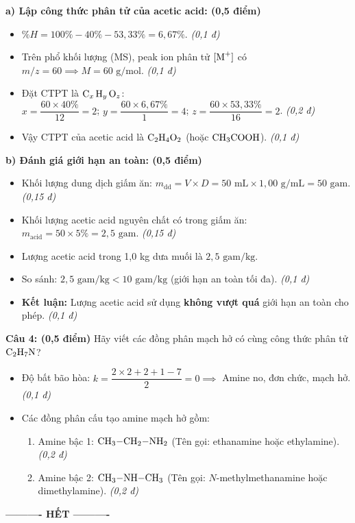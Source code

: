 \documentclass[11pt,a4paper]{article}
\begin{document}
\begin{tcolorbox}[colback=white,colframe=solBlue,title=\textbf{Lời giải chi tiết và Biểu điểm Câu 3:}]
\textbf{a) Lập công thức phân tử của acetic acid: (0,5 điểm)}
\begin{itemize}[leftmargin=1.2cm]
\item $\%H = 100\% - 40\% - 53,33\% = 6,67\%$. \hfill \textit{(0,1 đ)}
\item Trên phổ khối lượng (MS), peak ion phân tử $[\ce{M+}]$ có $m/z = 60 \implies M = 60\text{ g/mol}$. \hfill \textit{(0,1 đ)}
\item Đặt CTPT là $\ce{C_x H_y O_z}$:\\
  $x = \dfrac{60 \times 40\%}{12} = 2$; \quad $y = \dfrac{60 \times 6,67\%}{1} = 4$; \quad $z = \dfrac{60 \times 53,33\%}{16} = 2$. \hfill \textit{(0,2 đ)}
\item Vậy CTPT của acetic acid là $\ce{C2H4O2}$ (hoặc $\ce{CH3COOH}$). \hfill \textit{(0,1 đ)}
\end{itemize}
\textbf{b) Đánh giá giới hạn an toàn: (0,5 điểm)}
\begin{itemize}[leftmargin=1.2cm]
\item Khối lượng dung dịch giấm ăn: $m_{\text{dd}} = V \times D = 50\text{ mL} \times 1,00\text{ g/mL} = 50\text{ gam}$. \hfill \textit{(0,15 đ)}
\item Khối lượng acetic acid nguyên chất có trong giấm ăn:
  $m_{\text{acid}} = 50 \times 5\% = 2,5\text{ gam}$. \hfill \textit{(0,15 đ)}
\item Lượng acetic acid trong 1,0 kg dưa muối là $2,5\text{ gam/kg}$.
\item So sánh: $2,5\text{ gam/kg} < 10\text{ gam/kg}$ (giới hạn an toàn tối đa). \hfill \textit{(0,1 đ)}
\item \textbf{Kết luận:} Lượng acetic acid sử dụng \textbf{không vượt quá} giới hạn an toàn cho phép. \hfill \textit{(0,1 đ)}
\end{itemize}
\end{tcolorbox}

\vspace{4pt}
\noindent
\textbf{Câu 4: (0,5 điểm)} Hãy viết các đồng phân mạch hở có cùng công thức phân tử $\ce{C2H7N}$?

\begin{tcolorbox}[colback=white,colframe=solBlue,title=\textbf{Lời giải chi tiết và Biểu điểm Câu 4:}]
\begin{itemize}[leftmargin=1.2cm]
\item Độ bất bão hòa: $k = \dfrac{2 \times 2 + 2 + 1 - 7}{2} = 0 \implies$ Amine no, đơn chức, mạch hở. \hfill \textit{(0,1 đ)}
\item Các đồng phân cấu tạo amine mạch hở gồm:
  \begin{enumerate}
  \item Amine bậc 1: $\ce{CH3-CH2-NH2}$ \quad (Tên gọi: ethanamine hoặc ethylamine). \hfill \textit{(0,2 đ)}
  \item Amine bậc 2: $\ce{CH3-NH-CH3}$ \quad (Tên gọi: $N$-methylmethanamine hoặc dimethylamine). \hfill \textit{(0,2 đ)}
  \end{enumerate}
\end{itemize}
\end{tcolorbox}

\vspace{6pt}
\begin{center}
\textbf{\large ---------- HẾT ----------}
\end{center}
\end{document}

